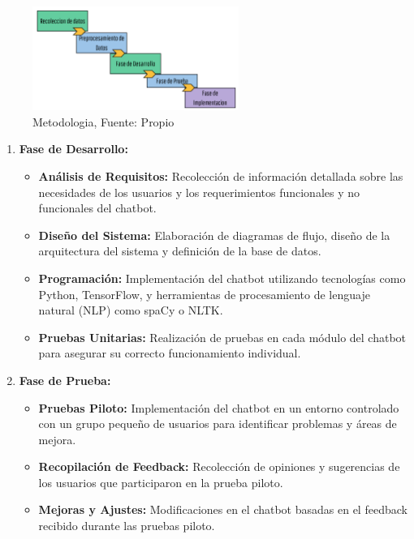\begin{figure}[H]
	\begin{center}
		\includegraphics[width=0.6\textwidth]{images_repo/METOD_CHATBOT_JP.png}
		\caption{Metodologia, Fuente: Propio}
		\label{1:fig}
	\end{center}
\end{figure}
\vspace{5mm}
\begin{enumerate}
	\item \textbf{Fase de Desarrollo:}
	\begin{itemize}
		\item \textbf{Análisis de Requisitos:} Recolección de información detallada sobre las necesidades de los usuarios y los requerimientos funcionales y no funcionales del chatbot.
		\item \textbf{Diseño del Sistema:} Elaboración de diagramas de flujo, diseño de la arquitectura del sistema y definición de la base de datos.
		\item \textbf{Programación:} Implementación del chatbot utilizando tecnologías como Python, TensorFlow, y herramientas de procesamiento de lenguaje natural (NLP) como spaCy o NLTK.
		\item \textbf{Pruebas Unitarias:} Realización de pruebas en cada módulo del chatbot para asegurar su correcto funcionamiento individual.
	\end{itemize}
	
	\item \textbf{Fase de Prueba:}
	\begin{itemize}
		\item \textbf{Pruebas Piloto:} Implementación del chatbot en un entorno controlado con un grupo pequeño de usuarios para identificar problemas y áreas de mejora.
		\item \textbf{Recopilación de Feedback:} Recolección de opiniones y sugerencias de los usuarios que participaron en la prueba piloto.
		\item \textbf{Mejoras y Ajustes:} Modificaciones en el chatbot basadas en el feedback recibido durante las pruebas piloto.
	\end{itemize}
	

\end{enumerate}
